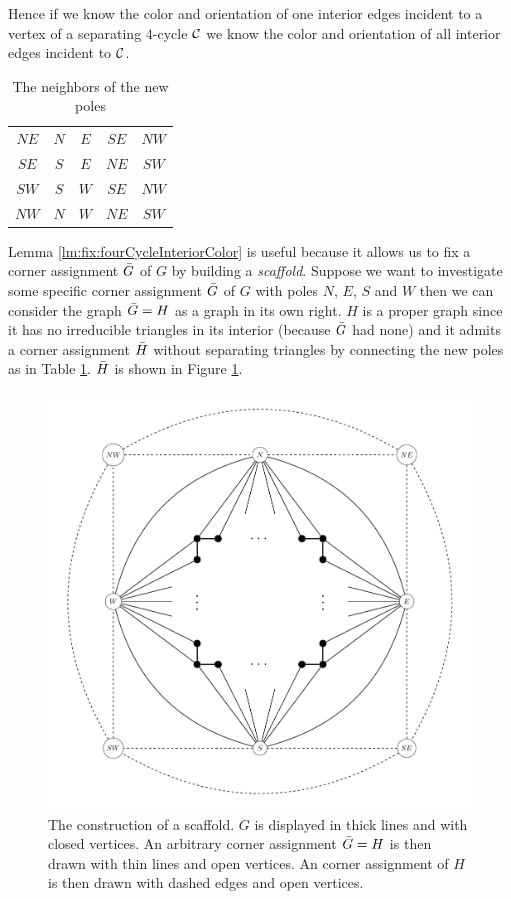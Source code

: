   Hence if we know the color and orientation of one interior edges incident to a vertex of a separating $4$-cycle $\mathcal{C}$ we know the color and orientation of all interior edges incident to $\mathcal{C}$.

  \begin{table}
    \centering
    \begin{tabular}{c|| c c c c}
      $NE$ & $N$ & $ E$ & $ SE$ & $ NW$ \\
      $SE$ & $S$ & $ E$ & $ NE$ & $ SW$\\
      $SW$ & $S$ & $ W$ & $ SE$ & $ NW$\\
      $NW$ & $N$ & $ W$ & $ NE$ & $ SW$\\
    \end{tabular}
    \caption{The neighbors of the new poles}
    \label{tab:scaffold}
  \end{table}

  Lemma \ref{lm:fix:fourCycleInteriorColor} is useful because it allows us to fix a corner assignment $\bar{G}$ of $G$ by building a \emph{scaffold}. Suppose we want to investigate some specific corner assignment $\bar{G}$ of $G$ with poles $N$, $E$, $S$ and $W$ then we can consider the graph $\bar{G} = H$ as a graph in its own right. $H$ is a proper graph since it has no irreducible triangles in its interior (because $\bar{G}$ had none) and it admits a corner assignment $\bar{H}$ without separating triangles by connecting the new poles as in Table \ref{tab:scaffold}. $\bar{H}$ is shown in Figure \ref{fig:scafold}.

  \begin{figure}[h!]
  \centering
  \includegraphics[scale=0.5]{fixExtension/img/scafold}

  \caption{The construction of a scaffold. $G$ is displayed in thick lines and with closed vertices. An arbitrary corner assignment $\bar{G} =H$ is then drawn with thin lines and open vertices. An corner assignment of $H$ is then drawn with dashed edges and open vertices.
      \label{fig:scafold}}
  \end{figure}


